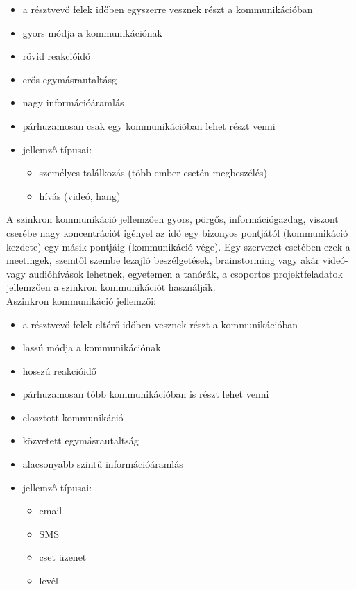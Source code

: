 \begin{itemize}
  \item a résztvevő felek időben egyszerre vesznek részt a kommunikációban
  \item gyors módja a kommunikációnak
  \item rövid reakcióidő
  \item erős egymásrautaltásg
  \item nagy információáramlás
  \item párhuzamosan csak egy kommunikációban lehet részt venni
  \item jellemző típusai:
  \begin{itemize}
    \item személyes találkozás (több ember esetén megbeszélés)
    \item hívás (videó, hang)
  \end{itemize}
\end{itemize}
A szinkron kommunikáció jellemzően gyors, pörgős, információgazdag, viszont cserébe nagy koncentrációt igényel az idő egy bizonyos pontjától (kommunikáció kezdete) egy másik pontjáig (kommunikáció vége). Egy szervezet esetében ezek a meetingek, szemtől szembe lezajló beszélgetések, brainstorming vagy akár videó- vagy audióhívások lehetnek, egyetemen a tanórák, a csoportos projektfeladatok jellemzően a szinkron kommunikációt használják.\\
\newline
Aszinkron kommunikáció jellemzői:
\begin{itemize}
  \item a résztvevő felek eltérő időben vesznek részt a kommunikációban
  \item lassú módja a kommunikációnak
  \item hosszú reakcióidő
  \item párhuzamosan több kommunikációban is részt lehet venni
  \item elosztott kommunikáció
  \item közvetett egymásrautaltság
  \item alacsonyabb szintű információáramlás
  \item jellemző típusai:
  \begin{itemize}
    \item email
    \item SMS
    \item cset üzenet
    \item levél
  \end{itemize}
\end{itemize}

